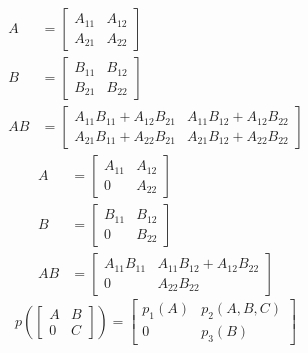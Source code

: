 \begin{remark} \thmslashn

    \begin{equation*}
        \begin{split}
            A &= \begin{bmatrix} A_{11} & A_{12}\\ A_{21} & A_{22} \end{bmatrix}\\
            B &= \begin{bmatrix} B_{11} & B_{12}\\ B_{21} & B_{22} \end{bmatrix}\\
            AB &= \begin{bmatrix} A_{11}B_{11} + A_{12}B_{21} & A_{11}B_{12} + A_{12}B_{22}\\ A_{21}B_{11} + A_{22}B_{21} & A_{21}B_{12} + A_{22}B_{22} \end{bmatrix} 
        \end{split}
    \end{equation*}
    \begin{equation*}
        \begin{split}
            A &= \begin{bmatrix} A_{11} & A_{12}\\ 0 & A_{22} \end{bmatrix}\\
            B &= \begin{bmatrix} B_{11} & B_{12}\\ 0 & B_{22} \end{bmatrix}\\
            AB &= \begin{bmatrix} A_{11}B_{11} & A_{11}B_{12} + A_{12}B_{22}\\ 0 & A_{22}B_{22} \end{bmatrix} 
        \end{split}
    \end{equation*}
    \begin{equation*}
        p\left( \begin{bmatrix} A & B\\ 0 & C \end{bmatrix}  \right) = \begin{bmatrix} p_1(A) & p_2(A, B, C)\\ 0 & p_3(B) \end{bmatrix}  
    \end{equation*}
\end{remark}
